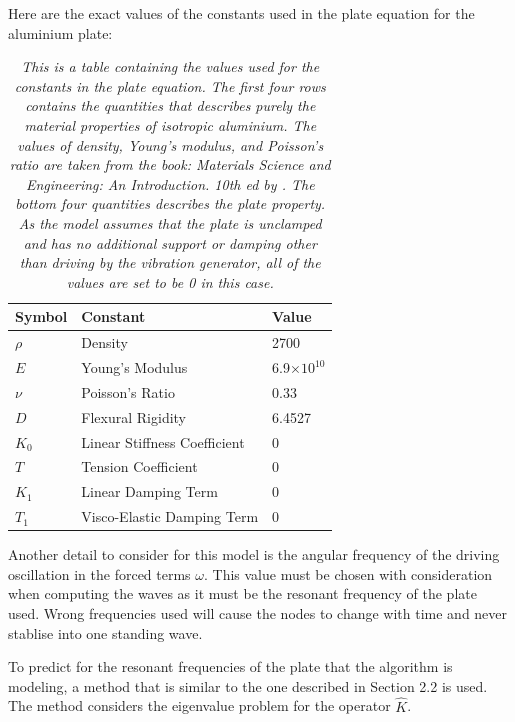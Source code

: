 Here are the exact values of the constants used in the plate equation for the aluminium plate:

\begin{table}[H]
    \centering
\begin{tabular}{|p{1.2cm}||p{3cm}p{1.6cm}|}
    \hline
    Symbol& Constant& Value\\
    \hline
    \hline
    $\rho$& Density& 2700\\
    \hline
    $E$& Young's Modulus& 6.9$\times 10^{10}$\\
    \hline
    $\nu$& Poisson's Ratio& 0.33\\
    \hline
    $D$& Flexural Rigidity& 6.4527\\
    \hline
    $K_0$& Linear Stiffness Coefficient& 0\\
    \hline
    $T$& Tension Coefficient& 0\\
    \hline
    $K_1$& Linear Damping Term& 0\\
    \hline
    $T_1$& Visco-Elastic Damping Term& 0\\
    \hline
\end{tabular}

\caption{\textit{\small This is a table containing the values used for the constants in the plate equation. The first four rows contains the quantities that describes purely the material properties of isotropic aluminium. The values of density, Young's modulus, and Poisson's ratio are taken from the book: Materials Science and Engineering: An Introduction. 10th ed by \textcite{callister2018materials}. The bottom four quantities describes the plate property. As the model assumes that the plate is unclamped and has no additional support or damping other than driving by the vibration generator, all of the values are set to be 0 in this case.}}
\end{table}

Another detail to consider for this model is the angular frequency of the driving oscillation in the forced terms $\omega$. This value must be chosen with consideration when computing the waves as it must be the resonant frequency of the plate used. Wrong frequencies used will cause the nodes to change with time and never stablise into one standing wave.

To predict for the resonant frequencies of the plate that the algorithm is modeling, a method that is similar to the one described in Section 2.2 is used. The method considers the eigenvalue problem for the operator $\hat{K}$\autocite{nguyen2021kirchhofflove}.

